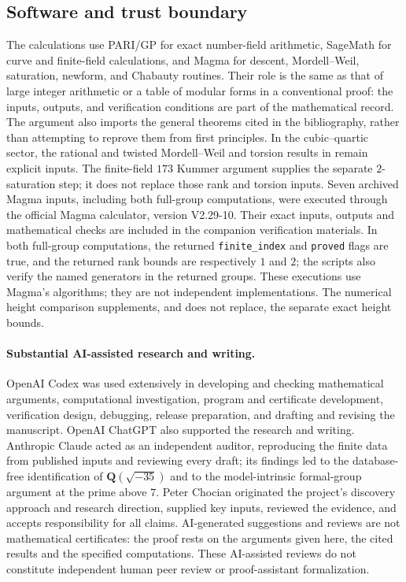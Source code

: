 \documentclass[11pt]{article}
\newcommand{\Q}{\mathbf Q}
\theoremstyle{definition}
\theoremstyle{remark}
\begin{document}
\subsection{Software and trust boundary}

The calculations use PARI/GP \cite{PARI} for exact number-field arithmetic,
SageMath \cite{Sage} for curve and finite-field calculations, and Magma
\cite{Magma} for descent,
Mordell--Weil, saturation, newform, and Chabauty routines.  Their role is
the same as that of large integer arithmetic or a table of modular forms in
a conventional proof: the inputs, outputs, and verification conditions are
part of the mathematical record.  The argument also imports the general
theorems cited in the bibliography, rather than attempting to reprove them
from first principles.  In the cubic--quartic sector, the rational and
twisted Mordell--Weil and torsion results in
\cite[Lemma~7.3]{DahmenSiksek} remain explicit inputs.
The finite-field $173$ Kummer argument supplies the separate
$2$-saturation step; it does not replace those rank and torsion inputs.
Seven archived Magma inputs, including both full-group computations,
were executed through the official Magma calculator, version V2.29-10.
Their exact inputs, outputs and mathematical checks are included in
the companion verification materials.  In both full-group computations,
the returned \texttt{finite\_index} and \texttt{proved} flags are true,
and the returned rank bounds are respectively $1$ and $2$; the scripts
also verify the named generators in the returned groups.  These executions use Magma's
algorithms; they are not independent implementations.  The numerical
height comparison supplements, and does not replace, the separate exact
height bounds.

\paragraph{Substantial AI-assisted research and writing.}
OpenAI Codex was used extensively in developing and checking mathematical
arguments, computational investigation, program and certificate development,
verification design, debugging, release preparation, and drafting and
revising the manuscript.  OpenAI ChatGPT also supported the research and
writing.  Anthropic Claude acted as an independent auditor, reproducing
the finite data from published inputs and reviewing every draft; its
findings led to the database-free identification of $\Q(\sqrt{-35})$ and
to the model-intrinsic formal-group argument at the prime above $7$.
Peter Chocian
originated the project's discovery approach and research direction,
supplied key inputs, reviewed the evidence, and accepts responsibility for
all claims.  AI-generated suggestions and reviews are not mathematical
certificates: the proof rests on the arguments given here, the cited
results and the specified computations.  These AI-assisted reviews do not
constitute independent human peer review or proof-assistant formalization.
\end{document}

